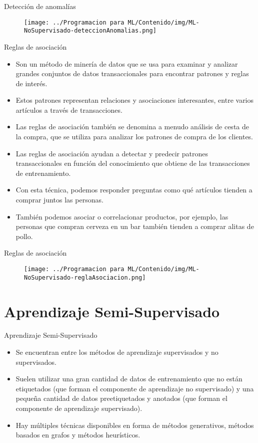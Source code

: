 \documentclass[11pt,aspectratio=169]{beamer}
\begin{document}
\begin{frame}{Detección de anomalías}
\begin{figure}[H]
	\centering
	\texttt{[image: ../Programacion para ML/Contenido/img/ML-NoSupervisado-deteccionAnomalias.png]}
\end{figure}
\end{frame}

\begin{frame}{Reglas de asociación}
\begin{itemize}
	\item Son un método de minería de datos que se usa para examinar y analizar grandes conjuntos de datos transaccionales para 
		encontrar patrones y reglas de interés. \pause
	\item Estos patrones representan relaciones y asociaciones interesantes, entre varios artículos a través de transacciones.\pause
	\item Las reglas de asociación también se denomina a menudo análisis de cesta de la compra, que se utiliza para analizar los patrones 
		de compra de los clientes.\pause
	\item Las reglas de asociación ayudan a detectar y predecir patrones transaccionales en función del conocimiento que obtiene de las 
		transacciones de entrenamiento.\pause
	\item Con esta técnica, podemos responder preguntas como qué artículos tienden a comprar juntos las personas.\pause
	\item También podemos asociar o correlacionar productos, por ejemplo, las personas que compran cerveza en un bar también tienden a 
		comprar alitas de pollo.
\end{itemize}
\end{frame}

\begin{frame}{Reglas de asociación}
\begin{figure}[H]
	\centering
	\texttt{[image: ../Programacion para ML/Contenido/img/ML-NoSupervisado-reglaAsociacion.png]}
\end{figure}	
\end{frame}

\section{Aprendizaje Semi-Supervisado}
\begin{frame}{Aprendizaje Semi-Supervisado}
\begin{itemize}
	\item Se encuentran entre los métodos de aprendizaje supervisados y no supervisados.\pause
	\item Suelen utilizar una gran cantidad de datos de entrenamiento que no están etiquetados (que forman el componente de aprendizaje no supervisado) 
		y una pequeña cantidad de datos preetiquetados y anotados (que forman el componente de aprendizaje supervisado).\pause
	\item Hay múltiples técnicas disponibles en forma de métodos generativos, métodos basados en grafos y métodos heurísticos.
\end{itemize}
\end{frame}
\end{document}
